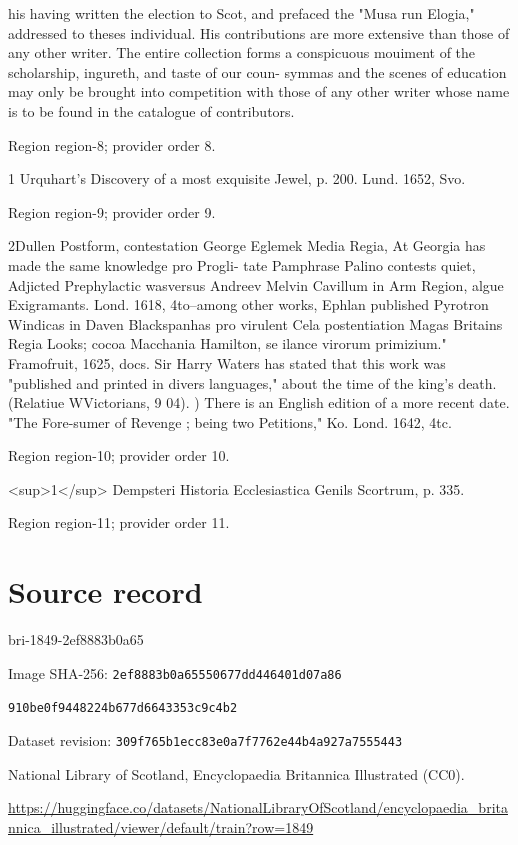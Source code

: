 \documentclass[11pt]{article}
\begin{document}
his having written the election to Scot, and prefaced the "Musa run Elogia," addressed to theses individual. His contributions are more extensive than those of any other writer. The entire collection forms a conspicuous mouiment of the scholarship, ingureth, and taste of our coun- symmas and the scenes of education may only be brought into competition with those of any other writer whose name is to be found in the catalogue of contributors.
\par

{\scriptsize\color{gray} Region region-8; provider order 8.\par}
\medskip

1 Urquhart's Discovery of a most exquisite Jewel, p. 200. Lund. 1652, Svo.
\par

{\scriptsize\color{gray} Region region-9; provider order 9.\par}
\medskip

2Dullen Postform, contestation George Eglemek Media Regia, At Georgia has made the same knowledge pro Progli- tate Pamphrase Palino contests quiet, Adjicted Prephylactic wasversus Andreev Melvin Cavillum in Arm Region, algue Exigramants. Lond. 1618, 4to--among other works, Ephlan published Pyrotron Windicas in Daven Blackspanhas pro virulent Cela postentiation Magas Britains Regia Looks; cocoa Macchania Hamilton, se ilance virorum primizium." Framofruit, 1625, docs. Sir Harry Waters has stated that this work was "published and printed in divers languages," about the time of the king's death. (Relatiue WVictorians, 9 04). ) There is an English edition of a more recent date. "The Fore-sumer of Revenge ; being two Petitions," Ko. Lond. 1642, 4tc.
\par

{\scriptsize\color{gray} Region region-10; provider order 10.\par}
\medskip

<sup>1</sup> Dempsteri Historia Ecclesiastica Genils Scortrum, p. 335.
\par

{\scriptsize\color{gray} Region region-11; provider order 11.\par}
\medskip
\newpage\section*{Source record}
bri-1849-2ef8883b0a65\par
Image SHA-256: \texttt{2ef8883b0a65550677dd446401d07a86}\par\texttt{910be0f9448224b677d6643353c9c4b2}\par
Dataset revision: \texttt{309f765b1ecc83e0a7f7}\texttt{762e44b4a927a7555443}\par
National Library of Scotland, Encyclopaedia Britannica Illustrated (CC0).\par
\url{https://huggingface.co/datasets/NationalLibraryOfScotland/encyclopaedia_britannica_illustrated/viewer/default/train?row=1849}
\end{document}
